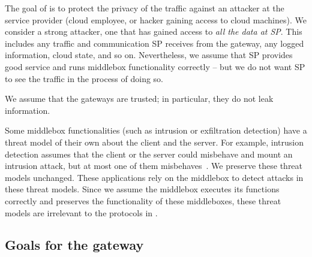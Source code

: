 The goal of \sys is to protect the privacy of the traffic against an attacker at the service provider  
(cloud employee, or hacker gaining access to cloud machines). 
We consider a strong  attacker, one that has gained access to {\em all the data at SP}.
This includes any traffic and communication SP receives from the 
gateway, any logged information, cloud state, and so on. Nevertheless, we assume that 
SP provides good service and runs middlebox functionality correctly -- but we do not want SP to 
see the traffic in the process of doing so.  

We assume that the gateways are trusted; in particular,  they do not leak information.


Some middlebox functionalities (such as intrusion or exfiltration detection) have a threat model
of their own about the client and the server. For example, intrusion detection assumes that 
the client or the server could misbehave and mount an intrusion attack, but at most one of them misbehaves~\cite{Bro}.  
We preserve these threat models unchanged. These applications rely
on the middlebox to detect attacks in these threat models. Since we assume the middlebox executes
its functions correctly and \sys preserves the functionality of these middleboxes, 
these threat models are irrelevant to the protocols in \sys. %


\subsection{Goals for the gateway}

